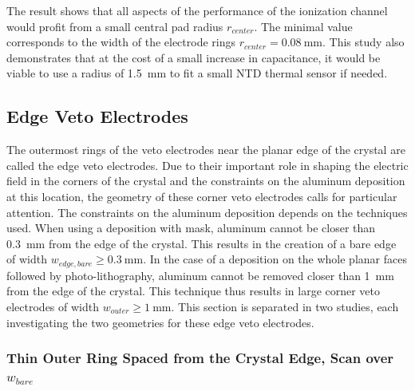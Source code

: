 The result shows that all aspects of the performance of the ionization channel would profit from a small central pad radius $r_{center}$. The minimal value corresponds to the width of the electrode rings $r_{center}=\SI{0.08}{\mm}$. This study also demonstrates that at the cost of a small increase in capacitance, it would be viable to use a radius of \SI{1.5}{\mm} to fit a small NTD thermal sensor if needed.



\subsection{Edge Veto Electrodes}

The outermost rings of the veto electrodes near the planar edge of the crystal are called the edge veto electrodes. Due to their important role in shaping the electric field in the corners of the crystal and the constraints on the aluminum deposition at this location, the geometry of these corner veto electrodes calls for particular attention.
The constraints on the aluminum deposition depends on the techniques used. When using a deposition with mask, aluminum cannot be closer than \SI{0.3}{\mm} from the edge of the crystal. This results in the creation of a bare edge of width $w_{edge, bare} \geq \SI{0.3}{\mm}$. In the case of a deposition on the whole planar faces followed by photo-lithography, aluminum cannot be removed closer than \SI{1}{\mm} from the edge of the crystal. This technique thus results in large corner veto electrodes of width $w_{outer}\geq \SI{1}{\mm}$.
This section is separated in two studies, each investigating the two geometries for these edge veto electrodes.


\subsubsection{Thin Outer Ring Spaced from the Crystal Edge, Scan over $w_{bare}$}


